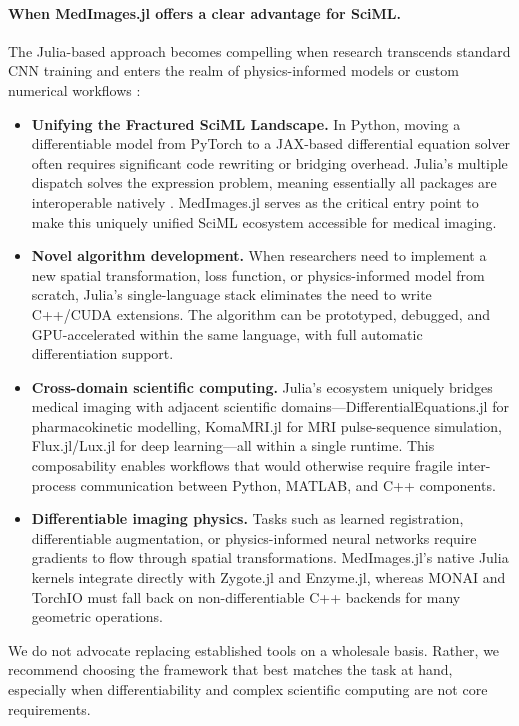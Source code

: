 \documentclass[a4paper,10pt,preprint]{elsarticle}
\begin{document}
\paragraph{When MedImages.jl offers a clear advantage for SciML.}
The Julia-based approach becomes compelling when research transcends standard CNN training and enters the realm of physics-informed models or custom numerical workflows \cite{RoeschGreener2023}:
\begin{itemize}
    \item \textbf{Unifying the Fractured SciML Landscape.} In Python, moving a differentiable model from PyTorch to a JAX-based differential equation solver often requires significant code rewriting or bridging overhead. Julia's multiple dispatch solves the expression problem, meaning essentially all packages are interoperable natively \cite{PalBhattacharya2024, EschleGl2023}. MedImages.jl serves as the critical entry point to make this uniquely unified SciML ecosystem accessible for medical imaging.
    \item \textbf{Novel algorithm development.} When researchers need to implement a new spatial transformation, loss function, or physics-informed model from scratch, Julia's single-language stack eliminates the need to write C++/CUDA extensions. The algorithm can be prototyped, debugged, and GPU-accelerated within the same language, with full automatic differentiation support.
    \item \textbf{Cross-domain scientific computing.} Julia's ecosystem uniquely bridges medical imaging with adjacent scientific domains---DifferentialEquations.jl for pharmacokinetic modelling, KomaMRI.jl \cite{CastilloPassiCoronado2023} for MRI pulse-sequence simulation, Flux.jl/Lux.jl \cite{pal2023lux} for deep learning---all within a single runtime. This composability enables workflows that would otherwise require fragile inter-process communication between Python, MATLAB, and C++ components.
    \item \textbf{Differentiable imaging physics.} Tasks such as learned registration, differentiable augmentation, or physics-informed neural networks require gradients to flow through spatial transformations. MedImages.jl's native Julia kernels integrate directly with Zygote.jl and Enzyme.jl, whereas MONAI and TorchIO must fall back on non-differentiable C++ backends for many geometric operations.
\end{itemize}

We do not advocate replacing established tools on a wholesale basis. Rather, we recommend choosing the framework that best matches the task at hand, especially when differentiability and complex scientific computing are not core requirements.
\end{document}
